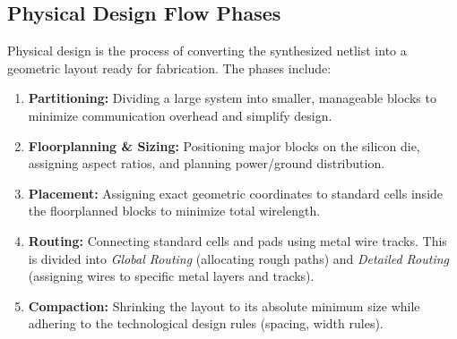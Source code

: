 \documentclass[12pt,a4paper]{article}
\begin{document}
\begin{tcolorbox}[tikzbox, title={Gajski-Kuhn Y-Chart}]
\end{tcolorbox}

\subsection{Physical Design Flow Phases}
Physical design is the process of converting the synthesized netlist into a geometric layout ready for fabrication. The phases include:
\begin{enumerate}[leftmargin=*, itemsep=2pt]
  \item \textbf{Partitioning:} Dividing a large system into smaller, manageable blocks to minimize communication overhead and simplify design.
  \item \textbf{Floorplanning \& Sizing:} Positioning major blocks on the silicon die, assigning aspect ratios, and planning power/ground distribution.
  \item \textbf{Placement:} Assigning exact geometric coordinates to standard cells inside the floorplanned blocks to minimize total wirelength.
  \item \textbf{Routing:} Connecting standard cells and pads using metal wire tracks. This is divided into \textit{Global Routing} (allocating rough paths) and \textit{Detailed Routing} (assigning wires to specific metal layers and tracks).
  \item \textbf{Compaction:} Shrinking the layout to its absolute minimum size while adhering to the technological design rules (spacing, width rules).
\end{enumerate}
\end{document}
